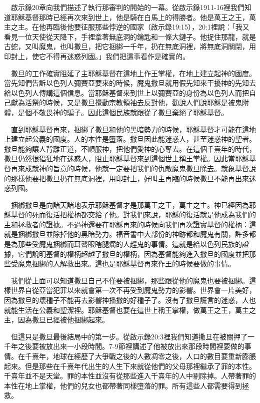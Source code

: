 \documentclass{book}
\begin{document}
　啟示錄20章向我們描述了執行那審判的開始的一幕。從啟示錄1911-16裡我們知道耶穌基督那時已經再次來到世上，他是騎在白馬上的得勝者。他是萬王之王，萬主之主。在他再臨後他要征服那些悖逆的國家（啟示錄19:15），20:1裡說：「我又看見一位天使從天降下，手裡拿著無底洞的鑰匙和一條大鏈子。他捉住那龍，就是古蛇，又叫魔鬼，也叫撒旦，把它捆綁一千年，扔在無底洞裡，將無底洞關閉，用印封上，使它不得再迷惑列國。」我們把這事看作是確實的。

　撒旦的工作確實阻延了主耶穌基督在這地上作王掌權，在地上建立起神的國度。當先知們告訴以色列人彌賽亞要來的時候，魔鬼撒旦就用假先知來干擾神的先知去給以色列人傳講這個信息。當耶穌基督來到世上以彌賽亞的身份為以色列人而把自己獻為活祭的時候，又是撒旦攪動宗教領袖去反對他，勸說人們說耶穌是被鬼附體，是個不敬畏神的騙子。因此這個民族就跟從了撒旦棄絕了耶穌基督。

　直到耶穌基督再來，捆綁了撒旦和他的黑暗勢力的時候，耶穌基督才可能在這地上建立起公義的國度。人的本性是墮落。撒旦因此能迷惑人，甚至迷惑神的聖者。撒旦能夠讓人背離正道，不順服神，把他們愛神的心奪去。在這個千熹年的時代，撒旦仍然很猖狂地在迷惑人，阻止耶穌基督來到這個世上稱王掌權。因此當耶穌基督再來成就神的旨意的時候，他就一定要把我們的仇敵魔鬼撒旦除去。就象基督說的那樣他要把撒旦扔在無底洞裡，用印封上，好叫主再臨的時候撒旦不能再出來迷惑列國。

　捆綁撒旦是向諸天諸地表示耶穌基督才是那萬王之王，萬主之主。神已經因為耶穌基督的死而復活把權柄都交給了他。對我們來說，耶穌的復活就是他成為我們的主和拯救者的證據。不過神還要在耶穌再來的時候向我們再次證實基督的權柄：這就是捆綁撒旦並除掉他的黑暗勢力。福音書中大部份的神跡都和魔鬼有關，許多都是為那些受魔鬼捆綁而耳聾眼瞎腿瘸的人趕鬼的事情。這就是給以色列民族的證據，它們說明基督的權柄超越了撒旦的權柄，因為基督能夠進入撒旦的國度並把那些受魔鬼捆綁的人解救出來。這也是耶穌基督再來作王的時候要做的事情。

　我們從上面可以知道撒旦自己不僅要被捆綁，那些跟從他的魔鬼也要被捆綁。這樣世界自從亞當犯罪以來就會第一次不再受到魔鬼勢力的影響。世界會一片美好，因為撒旦的壞種子不能再去影響神播撒的好種子了。沒有了撒旦謊言的迷惑，人也就能生活在公義和聖潔裡。耶穌基督也要在這世上稱王掌權，做萬王之王，萬主之主，因為撒旦已經被他捆綁起來。

　但這只是撒旦最後結局中的第一步。從啟示錄20:3裡我們知道撒旦在被關押了一千年之後要被放出來一小段時間。7-9節裡講述了他被放出來那段時間裡要做的事情。在千熹年，地球在經歷了大爭戰之後的人數凋零之後，人口的數目要重新膨脹起來。但是那些在千熹年代出生的人生下來就從他們的父母那裡繼承了罪的本性。千熹年並不是天堂。罪的本性並沒有從那些進入千熹年的人中剔除掉。人帶著罪的本性在地上掌權，他們的兒女也都帶著同樣墮落的罪。所有這些人都需要得到拯救。
\end{document}
